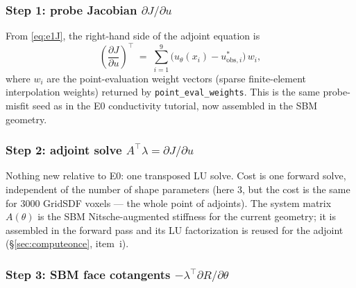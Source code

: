 \documentclass[11pt]{article}
\begin{document}
\subsubsection{Step 1: probe Jacobian $\partial J/\partial u$}

From \eqref{eq:e1J}, the right-hand side of the adjoint equation is
\begin{equation}
  \left(\frac{\partial J}{\partial u}\right)^\top
  \;=\; \sum_{i=1}^{9} \bigl(u_\theta(x_i) - u^*_{\mathrm{obs},i}\bigr)\,
  w_i,
  \label{eq:e1rhs}
\end{equation}
where $w_i$ are the point-evaluation weight vectors (sparse finite-element
interpolation weights) returned by \texttt{point\_eval\_weights}.
This is the same probe-misfit seed as in the E0 conductivity tutorial,
now assembled in the SBM geometry.

\subsubsection{Step 2: adjoint solve $A^\top \lambda = \partial J/\partial u$}

Nothing new relative to E0: one transposed LU solve.  Cost is one forward
solve, independent of the number of shape parameters (here 3, but the cost
is the same for 3000 GridSDF voxels --- the whole point of adjoints).  The
system matrix $A(\theta)$ is the SBM Nitsche-augmented stiffness for the
current geometry; it is assembled in the forward pass and its LU
factorization is reused for the adjoint (\S\ref{sec:computeonce}, item~i).

\subsubsection{Step 3: SBM face cotangents $-\lambda^\top \partial R/\partial \theta$}
\label{sec:e1sbmtape}
\end{document}

